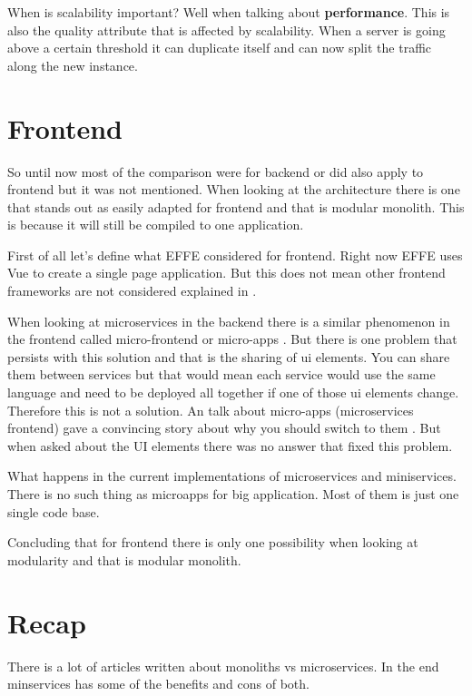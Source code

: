 When is scalability important? Well when talking about \textbf{performance}. This is also the quality attribute that is affected by scalability. When a server is going above a certain threshold it can duplicate itself and can now split the traffic along the new instance.

\section{Frontend}
\label{sec:Frontend}

So until now most of the comparison were for backend or did also apply to frontend but it was not mentioned. When looking at the architecture there is one that stands out as easily adapted for frontend and that is modular monolith. This is because it will still be compiled to one application.

First of all let’s define what EFFE considered for frontend. Right now EFFE uses Vue to create a single page application. But this does not mean other frontend frameworks are not considered explained in .

When looking at microservices in the backend there is a similar phenomenon in the frontend called micro-frontend or micro-apps \cite{microFrontends}. But there is one problem that persists with this solution and that is the sharing of ui elements. You can share them between services but that would mean each service would use the same language and need to be deployed all together if one of those ui elements change. Therefore this is not a solution. An talk about micro-apps (microservices frontend) gave a convincing story about why you should switch to them \cite{frontendMicroservices}. But when asked about the UI elements there was no answer that fixed this problem.

What happens in the current implementations of microservices and miniservices. There is no such thing as microapps for big application. Most of them is just one single code base.

Concluding that for frontend there is only one possibility when looking at modularity and that is modular monolith.

\section{Recap}

There is a lot of articles written about monoliths vs microservices. In the end minservices has some of the benefits and cons of both.

